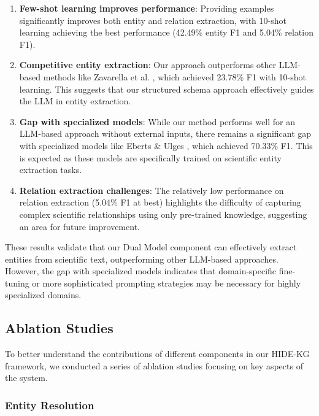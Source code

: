 \documentclass[11pt]{article}
\begin{document}
\begin{enumerate}
    \item \textbf{Few-shot learning improves performance}: Providing examples significantly improves both entity and relation extraction, with 10-shot learning achieving the best performance (42.49\% entity F1 and 5.04\% relation F1).

    \item \textbf{Competitive entity extraction}: Our approach outperforms other LLM-based methods like Zavarella et al. \cite{zavarella2024a}, which achieved 23.78\% F1 with 10-shot learning. This suggests that our structured schema approach effectively guides the LLM in entity extraction.

    \item \textbf{Gap with specialized models}: While our method performs well for an LLM-based approach without external inputs, there remains a significant gap with specialized models like Eberts \& Ulges \cite{Eberts_Markus_2020}, which achieved 70.33\% F1. This is expected as these models are specifically trained on scientific entity extraction tasks.

    \item \textbf{Relation extraction challenges}: The relatively low performance on relation extraction (5.04\% F1 at best) highlights the difficulty of capturing complex scientific relationships using only pre-trained knowledge, suggesting an area for future improvement.
\end{enumerate}

These results validate that our Dual Model component can effectively extract entities from scientific text, outperforming other LLM-based approaches. However, the gap with specialized models indicates that domain-specific fine-tuning or more sophisticated prompting strategies may be necessary for highly specialized domains.

\subsection{Ablation Studies}

To better understand the contributions of different components in our HIDE-KG framework, we conducted a series of ablation studies focusing on key aspects of the system.

\subsubsection{Entity Resolution}
\end{document}
